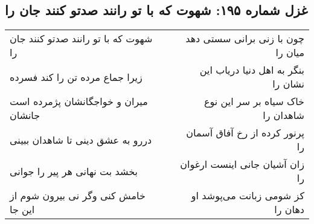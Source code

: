\begin{center}
\section*{غزل شماره ۱۹۵: شهوت که با تو رانند صدتو کنند جان را}
\label{sec:0195}
\begin{longtable}{l p{0.5cm} r}
شهوت که با تو رانند صدتو کنند جان را
&&
چون با زنی برانی سستی دهد میان را
\\
زیرا جماع مرده تن را کند فسرده
&&
بنگر به اهل دنیا دریاب این نشان را
\\
میران و خواجگانشان پژمرده است جانشان
&&
خاک سیاه بر سر این نوع شاهدان را
\\
دررو به عشق دینی تا شاهدان ببینی
&&
پرنور کرده از رخ آفاق آسمان را
\\
بخشد بت نهانی هر پیر را جوانی
&&
زان آشیان جانی اینست ارغوان را
\\
خامش کنی وگر نی بیرون شوم از این جا
&&
کز شومی زبانت می‌پوشد او دهان را
\\
\end{longtable}
\end{center}
